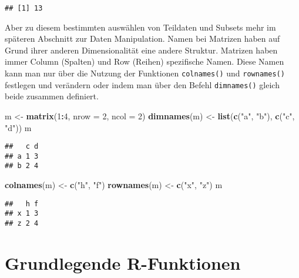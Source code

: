 \documentclass[
]{book}
\newenvironment{Shaded}{\begin{snugshade}}{\end{snugshade}}
\newcommand{\DataTypeTok}[1]{\textcolor[rgb]{0.13,0.29,0.53}{#1}}
\newcommand{\DecValTok}[1]{\textcolor[rgb]{0.00,0.00,0.81}{#1}}
\newcommand{\KeywordTok}[1]{\textcolor[rgb]{0.13,0.29,0.53}{\textbf{#1}}}
\newcommand{\NormalTok}[1]{#1}
\newcommand{\OperatorTok}[1]{\textcolor[rgb]{0.81,0.36,0.00}{\textbf{#1}}}
\newcommand{\StringTok}[1]{\textcolor[rgb]{0.31,0.60,0.02}{#1}}
\begin{document}
\begin{verbatim}
## [1] 13
\end{verbatim}

Aber zu diesem bestimmten auswählen von Teildaten und Subsets mehr im späteren Abschnitt zur Daten Manipulation.
Namen bei Matrizen haben auf Grund ihrer anderen Dimensionalität eine andere Struktur.
Matrizen haben immer Column (Spalten) und Row (Reihen) spezifische Namen.
Diese Namen kann man nur über die Nutzung der Funktionen \texttt{colnames()} und \texttt{rownames()} festlegen und verändern oder indem man über den Befehl \texttt{dimnames()} gleich beide zusammen definiert.

\begin{Shaded}
\begin{Highlighting}[]
\NormalTok{m <-}\StringTok{ }\KeywordTok{matrix}\NormalTok{(}\DecValTok{1}\OperatorTok{:}\DecValTok{4}\NormalTok{, }\DataTypeTok{nrow =} \DecValTok{2}\NormalTok{, }\DataTypeTok{ncol =} \DecValTok{2}\NormalTok{)}
\KeywordTok{dimnames}\NormalTok{(m) <-}\StringTok{ }\KeywordTok{list}\NormalTok{(}\KeywordTok{c}\NormalTok{(}\StringTok{"a"}\NormalTok{, }\StringTok{"b"}\NormalTok{), }\KeywordTok{c}\NormalTok{(}\StringTok{"c"}\NormalTok{, }\StringTok{"d"}\NormalTok{))}
\NormalTok{m}
\end{Highlighting}
\end{Shaded}

\begin{verbatim}
##   c d
## a 1 3
## b 2 4
\end{verbatim}

\begin{Shaded}
\begin{Highlighting}[]
\KeywordTok{colnames}\NormalTok{(m) <-}\StringTok{ }\KeywordTok{c}\NormalTok{(}\StringTok{"h"}\NormalTok{, }\StringTok{"f"}\NormalTok{)}
\KeywordTok{rownames}\NormalTok{(m) <-}\StringTok{ }\KeywordTok{c}\NormalTok{(}\StringTok{"x"}\NormalTok{, }\StringTok{"z"}\NormalTok{)}
\NormalTok{m}
\end{Highlighting}
\end{Shaded}

\begin{verbatim}
##   h f
## x 1 3
## z 2 4
\end{verbatim}

\hypertarget{kapitel3.3}{%
\chapter{\texorpdfstring{Grundlegende \textbf{R}-Funktionen}{Grundlegende R-Funktionen}}\label{kapitel3.3}}
\end{document}
